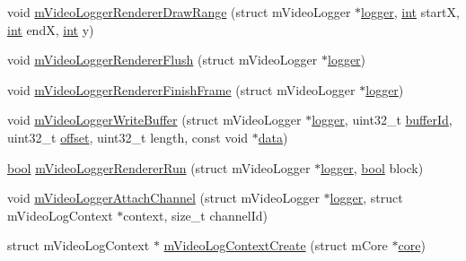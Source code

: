 \begin{DoxyCompactItemize}
\item 
void \mbox{\hyperlink{video-logger_8c_a4ba6e2f71a9a753f746248d6b0855e7b}{m\+Video\+Logger\+Renderer\+Draw\+Range}} (struct m\+Video\+Logger $\ast$\mbox{\hyperlink{libretro_8c_a370b093d59813e9620a3b73b831162c2}{logger}}, \mbox{\hyperlink{ioapi_8h_a787fa3cf048117ba7123753c1e74fcd6}{int}} startX, \mbox{\hyperlink{ioapi_8h_a787fa3cf048117ba7123753c1e74fcd6}{int}} endX, \mbox{\hyperlink{ioapi_8h_a787fa3cf048117ba7123753c1e74fcd6}{int}} y)
\item 
void \mbox{\hyperlink{video-logger_8c_a62188c3c2ee5b48e38f1f79431d50551}{m\+Video\+Logger\+Renderer\+Flush}} (struct m\+Video\+Logger $\ast$\mbox{\hyperlink{libretro_8c_a370b093d59813e9620a3b73b831162c2}{logger}})
\item 
void \mbox{\hyperlink{video-logger_8c_ae0985d556c5cd2c11d95f3b0c8e820af}{m\+Video\+Logger\+Renderer\+Finish\+Frame}} (struct m\+Video\+Logger $\ast$\mbox{\hyperlink{libretro_8c_a370b093d59813e9620a3b73b831162c2}{logger}})
\item 
void \mbox{\hyperlink{video-logger_8c_a1548cd96c67d81fecdd4e71df06c6b2f}{m\+Video\+Logger\+Write\+Buffer}} (struct m\+Video\+Logger $\ast$\mbox{\hyperlink{libretro_8c_a370b093d59813e9620a3b73b831162c2}{logger}}, uint32\+\_\+t \mbox{\hyperlink{3ds_2main_8c_a28a1f39901bcbdd2fb34c81ca5649a4a}{buffer\+Id}}, uint32\+\_\+t \mbox{\hyperlink{ioapi_8h_a601c4660e8a1a14a1b87fe387e934d19}{offset}}, uint32\+\_\+t length, const void $\ast$\mbox{\hyperlink{libretro_8c_a735984d41155bc1032e09bece8f8d66d}{data}})
\item 
\mbox{\hyperlink{libretro_8h_a4a26dcae73fb7e1528214a068aca317e}{bool}} \mbox{\hyperlink{video-logger_8c_ab790ed3e764c170c154f5781ecba758d}{m\+Video\+Logger\+Renderer\+Run}} (struct m\+Video\+Logger $\ast$\mbox{\hyperlink{libretro_8c_a370b093d59813e9620a3b73b831162c2}{logger}}, \mbox{\hyperlink{libretro_8h_a4a26dcae73fb7e1528214a068aca317e}{bool}} block)
\item 
void \mbox{\hyperlink{video-logger_8c_ab35cded24430e8df5eea72310c1827be}{m\+Video\+Logger\+Attach\+Channel}} (struct m\+Video\+Logger $\ast$\mbox{\hyperlink{libretro_8c_a370b093d59813e9620a3b73b831162c2}{logger}}, struct m\+Video\+Log\+Context $\ast$context, size\+\_\+t channel\+Id)
\item 
struct m\+Video\+Log\+Context $\ast$ \mbox{\hyperlink{video-logger_8c_abfc652080406bf430af299f8ab419aec}{m\+Video\+Log\+Context\+Create}} (struct m\+Core $\ast$\mbox{\hyperlink{libretro_8c_a0fa20029c1b76361c88b7c2b13e89aff}{core}})
\item 

\end{DoxyCompactItemize}
